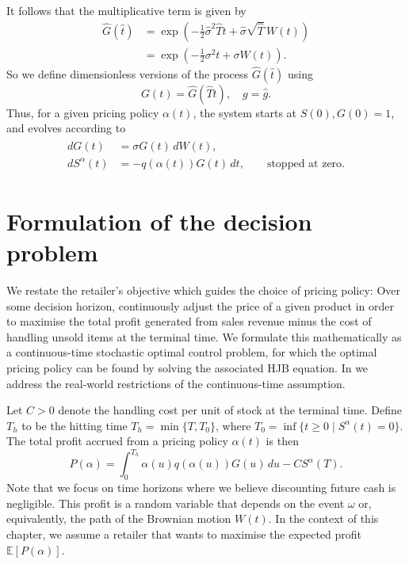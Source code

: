 \documentclass[main.tex]{subfiles}
\begin{document}
It follows that the multiplicative term is given by
\begin{align}
  \hat{G}(\hat{t})
  &=\exp\left(
    -{\textstyle\frac{1}{2}}\hat{\sigma}^2\hat{T}t +\hat{\sigma} \sqrt{\hat{T}}\,W(t)\right)\\
  &=\exp\left(-{\textstyle\frac{1}{2}}\sigma^2t +\sigma W(t)\right).
\end{align}
So we define dimensionless versions of the process $\hat{G}(\hat{t})$
using
\begin{equation}
  G(t)=\hat{G}(\hat{T}t),\quad g=\hat{g}.
\end{equation}
Thus, for a given pricing policy $\alpha(t)$, the
system starts at $S(0),G(0)=1$, and evolves according to
\begin{align}
  \begin{split}\label{eq:gbm_sde_nondim}
    d G(t)&=\sigma G(t)\,dW(t),\\
    dS^{\alpha}(t)&=-q(\alpha(t))G(t)\,dt,
    \qquad\text{stopped at zero}.
  \end{split}
\end{align}

\section{Formulation of the decision
  problem}\label{sec:decision_formulation}
We restate the retailer's objective which
guides the choice of pricing policy: Over some decision horizon, continuously
adjust the price of a given product in order to maximise
the total profit generated from sales revenue minus the cost of handling
unsold items at the terminal time. We formulate this mathematically as
a continuous-time stochastic optimal control problem, for which the optimal pricing
policy can be found by solving the associated HJB equation.
In  we address the real-world restrictions of
the continuous-time assumption.

Let $C>0$ denote the handling cost per unit of stock at the terminal
time. Define $T_h$ to be the hitting time $T_h=\min \{T, T_0\}$, where
$T_0=\inf\{t\geq 0\mid S^\alpha(t)=0\}$.
The total profit accrued from a pricing policy $\alpha(t)$ is then
\begin{equation}\label{eq:profit_expression}
  P(\alpha) = \int_0^{T_h}\alpha(u)q(\alpha(u))G(u)\,du - CS^\alpha(T).
\end{equation}
Note that we focus on time horizons where we believe discounting
future cash is negligible.
This profit is a random variable that depends on the event $\omega$
or, equivalently, the path of the
Brownian motion $W(t)$. %
In the context of this chapter, we assume a retailer that
wants to maximise the expected profit $\mathbb{E}[P(\alpha)]$.
\end{document}
